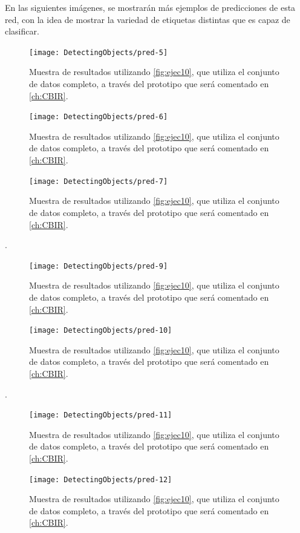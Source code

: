 En las siguientes imágenes, se mostrarán más ejemplos de predicciones de esta red, con la idea de mostrar la variedad de etiquetas distintas que es capaz de clasificar.\\
\begin{figure}[h!]
  \centering
  \texttt{[image: DetectingObjects/pred-5]}
  \caption{Muestra de resultados utilizando \autoref{fig:ejec10}, que utiliza el conjunto de datos completo, a través del prototipo que será comentado en \autoref{ch:CBIR}.}
  \label{fig:predict5}
\end{figure}
\begin{figure}[h!]
  \centering
  \texttt{[image: DetectingObjects/pred-6]}
  \caption{Muestra de resultados utilizando \autoref{fig:ejec10}, que utiliza el conjunto de datos completo, a través del prototipo que será comentado en \autoref{ch:CBIR}.}
  \label{fig:predict6}
\end{figure}
\newpage
\begin{figure}[h!]
  \centering
  \texttt{[image: DetectingObjects/pred-7]}
  \caption{Muestra de resultados utilizando \autoref{fig:ejec10}, que utiliza el conjunto de datos completo, a través del prototipo que será comentado en \autoref{ch:CBIR}.}
  \label{fig:predict7}
\end{figure}
\newpage
.
\begin{figure}[h!]
  \centering
  \texttt{[image: DetectingObjects/pred-9]}
  \caption{Muestra de resultados utilizando \autoref{fig:ejec10}, que utiliza el conjunto de datos completo, a través del prototipo que será comentado en \autoref{ch:CBIR}.}
  \label{fig:predict9}
\end{figure}
\begin{figure}[h!]
  \centering
  \texttt{[image: DetectingObjects/pred-10]}
  \caption{Muestra de resultados utilizando \autoref{fig:ejec10}, que utiliza el conjunto de datos completo, a través del prototipo que será comentado en \autoref{ch:CBIR}.}
  \label{fig:predict10}
\end{figure}
\newpage
.
\begin{figure}[h!]
  \centering
  \texttt{[image: DetectingObjects/pred-11]}
  \caption{Muestra de resultados utilizando \autoref{fig:ejec10}, que utiliza el conjunto de datos completo, a través del prototipo que será comentado en \autoref{ch:CBIR}.}
  \label{fig:predict11}
\end{figure}
\begin{figure}[h!]
  \centering
  \texttt{[image: DetectingObjects/pred-12]}
  \caption{Muestra de resultados utilizando \autoref{fig:ejec10}, que utiliza el conjunto de datos completo, a través del prototipo que será comentado en \autoref{ch:CBIR}.}
  \label{fig:predict12}
\end{figure}


